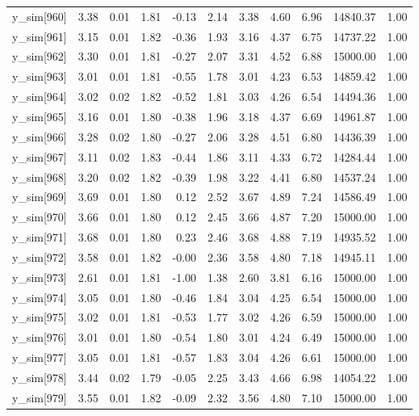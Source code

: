 \begin{table}[ht]
\begin{tabular}{rrrrrrrrrrr}
  y\_sim[960] & 3.38 & 0.01 & 1.81 & -0.13 & 2.14 & 3.38 & 4.60 & 6.96 & 14840.37 & 1.00 \\ 
  y\_sim[961] & 3.15 & 0.01 & 1.82 & -0.36 & 1.93 & 3.16 & 4.37 & 6.75 & 14737.22 & 1.00 \\ 
  y\_sim[962] & 3.30 & 0.01 & 1.81 & -0.27 & 2.07 & 3.31 & 4.52 & 6.88 & 15000.00 & 1.00 \\ 
  y\_sim[963] & 3.01 & 0.01 & 1.81 & -0.55 & 1.78 & 3.01 & 4.23 & 6.53 & 14859.42 & 1.00 \\ 
  y\_sim[964] & 3.02 & 0.02 & 1.82 & -0.52 & 1.81 & 3.03 & 4.26 & 6.54 & 14494.36 & 1.00 \\ 
  y\_sim[965] & 3.16 & 0.01 & 1.80 & -0.38 & 1.96 & 3.18 & 4.37 & 6.69 & 14961.87 & 1.00 \\ 
  y\_sim[966] & 3.28 & 0.02 & 1.80 & -0.27 & 2.06 & 3.28 & 4.51 & 6.80 & 14436.39 & 1.00 \\ 
  y\_sim[967] & 3.11 & 0.02 & 1.83 & -0.44 & 1.86 & 3.11 & 4.33 & 6.72 & 14284.44 & 1.00 \\ 
  y\_sim[968] & 3.20 & 0.02 & 1.82 & -0.39 & 1.98 & 3.22 & 4.41 & 6.80 & 14537.24 & 1.00 \\ 
  y\_sim[969] & 3.69 & 0.01 & 1.80 & 0.12 & 2.52 & 3.67 & 4.89 & 7.24 & 14586.49 & 1.00 \\ 
  y\_sim[970] & 3.66 & 0.01 & 1.80 & 0.12 & 2.45 & 3.66 & 4.87 & 7.20 & 15000.00 & 1.00 \\ 
  y\_sim[971] & 3.68 & 0.01 & 1.80 & 0.23 & 2.46 & 3.68 & 4.88 & 7.19 & 14935.52 & 1.00 \\ 
  y\_sim[972] & 3.58 & 0.01 & 1.82 & -0.00 & 2.36 & 3.58 & 4.80 & 7.18 & 14945.11 & 1.00 \\ 
  y\_sim[973] & 2.61 & 0.01 & 1.81 & -1.00 & 1.38 & 2.60 & 3.81 & 6.16 & 15000.00 & 1.00 \\ 
  y\_sim[974] & 3.05 & 0.01 & 1.80 & -0.46 & 1.84 & 3.04 & 4.25 & 6.54 & 15000.00 & 1.00 \\ 
  y\_sim[975] & 3.02 & 0.01 & 1.81 & -0.53 & 1.77 & 3.02 & 4.26 & 6.59 & 15000.00 & 1.00 \\ 
  y\_sim[976] & 3.01 & 0.01 & 1.80 & -0.54 & 1.80 & 3.01 & 4.24 & 6.49 & 15000.00 & 1.00 \\ 
  y\_sim[977] & 3.05 & 0.01 & 1.81 & -0.57 & 1.83 & 3.04 & 4.26 & 6.61 & 15000.00 & 1.00 \\ 
  y\_sim[978] & 3.44 & 0.02 & 1.79 & -0.05 & 2.25 & 3.43 & 4.66 & 6.98 & 14054.22 & 1.00 \\ 
  y\_sim[979] & 3.55 & 0.01 & 1.82 & -0.09 & 2.32 & 3.56 & 4.80 & 7.10 & 15000.00 & 1.00 \\ 

\end{tabular}
\end{table}
